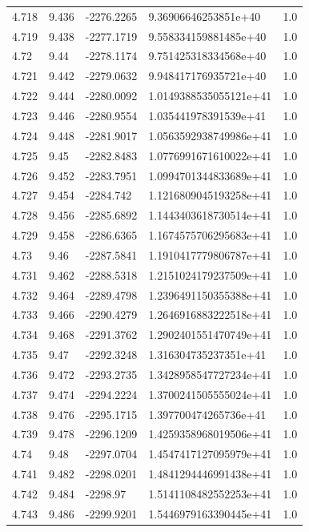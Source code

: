 \begin{tabular}{lllll}
4.718 & 9.436 & -2276.2265 & 9.36906646253851e+40 & 1.0 \\
4.719 & 9.438 & -2277.1719 & 9.558334159881485e+40 & 1.0 \\
4.72 & 9.44 & -2278.1174 & 9.751425318334568e+40 & 1.0 \\
4.721 & 9.442 & -2279.0632 & 9.948417176935721e+40 & 1.0 \\
4.722 & 9.444 & -2280.0092 & 1.0149388535055121e+41 & 1.0 \\
4.723 & 9.446 & -2280.9554 & 1.035441978391539e+41 & 1.0 \\
4.724 & 9.448 & -2281.9017 & 1.0563592938749986e+41 & 1.0 \\
4.725 & 9.45 & -2282.8483 & 1.0776991671610022e+41 & 1.0 \\
4.726 & 9.452 & -2283.7951 & 1.0994701344833689e+41 & 1.0 \\
4.727 & 9.454 & -2284.742 & 1.1216809045193258e+41 & 1.0 \\
4.728 & 9.456 & -2285.6892 & 1.1443403618730514e+41 & 1.0 \\
4.729 & 9.458 & -2286.6365 & 1.1674575706295683e+41 & 1.0 \\
4.73 & 9.46 & -2287.5841 & 1.1910417779806787e+41 & 1.0 \\
4.731 & 9.462 & -2288.5318 & 1.2151024179237509e+41 & 1.0 \\
4.732 & 9.464 & -2289.4798 & 1.2396491150355388e+41 & 1.0 \\
4.733 & 9.466 & -2290.4279 & 1.2646916883222518e+41 & 1.0 \\
4.734 & 9.468 & -2291.3762 & 1.2902401551470749e+41 & 1.0 \\
4.735 & 9.47 & -2292.3248 & 1.316304735237351e+41 & 1.0 \\
4.736 & 9.472 & -2293.2735 & 1.3428958547727234e+41 & 1.0 \\
4.737 & 9.474 & -2294.2224 & 1.3700241505555024e+41 & 1.0 \\
4.738 & 9.476 & -2295.1715 & 1.397700474265736e+41 & 1.0 \\
4.739 & 9.478 & -2296.1209 & 1.4259358968019506e+41 & 1.0 \\
4.74 & 9.48 & -2297.0704 & 1.4547417127095979e+41 & 1.0 \\
4.741 & 9.482 & -2298.0201 & 1.4841294446991438e+41 & 1.0 \\
4.742 & 9.484 & -2298.97 & 1.5141108482552253e+41 & 1.0 \\
4.743 & 9.486 & -2299.9201 & 1.5446979163390445e+41 & 1.0 \\

\end{tabular}

